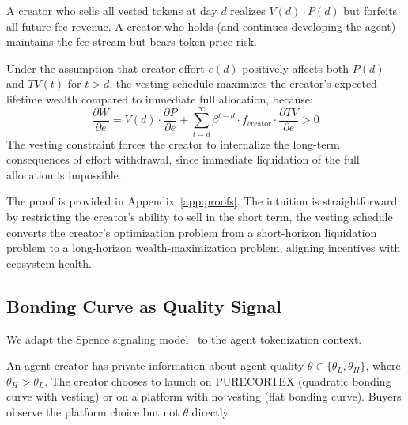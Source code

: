 A creator who sells all vested tokens at day $d$ realizes $V(d) \cdot P(d)$
but forfeits all future fee revenue. A creator who holds (and continues
developing the agent) maintains the fee stream but bears token price risk.

\begin{proposition}
\label{prop:creator-wealth}
Under the assumption that creator effort $e(d)$ positively affects both
$P(d)$ and $TV(t)$ for $t > d$, the vesting schedule maximizes the creator's
expected lifetime wealth compared to immediate full allocation, because:
\begin{equation}
  \frac{\partial W}{\partial e} = V(d) \cdot \frac{\partial P}{\partial e} + \sum_{t=d}^{\infty} \beta^{t-d} \cdot f_{\text{creator}} \cdot \frac{\partial TV}{\partial e} > 0
  \label{eq:effort-incentive}
\end{equation}
The vesting constraint forces the creator to internalize the long-term
consequences of effort withdrawal, since immediate liquidation of the full
allocation is impossible.
\end{proposition}

The proof is provided in Appendix~\ref{app:proofs}. The intuition is
straightforward: by restricting the creator's ability to sell in the short term,
the vesting schedule converts the creator's optimization problem from a
short-horizon liquidation problem to a long-horizon wealth-maximization problem,
aligning incentives with ecosystem health.

\subsection{Bonding Curve as Quality Signal}
\label{subsec:signaling}

We adapt the Spence signaling model~\citep{spence1973job} to the agent
tokenization context.

\begin{definition}
\label{def:quality-model}
An agent creator has private information about agent quality
$\theta \in \{\theta_L, \theta_H\}$, where $\theta_H > \theta_L$. The
creator chooses to launch on PURECORTEX (quadratic bonding curve with
vesting) or on a platform with no vesting (flat bonding curve). Buyers
observe the platform choice but not $\theta$ directly.
\end{definition}

